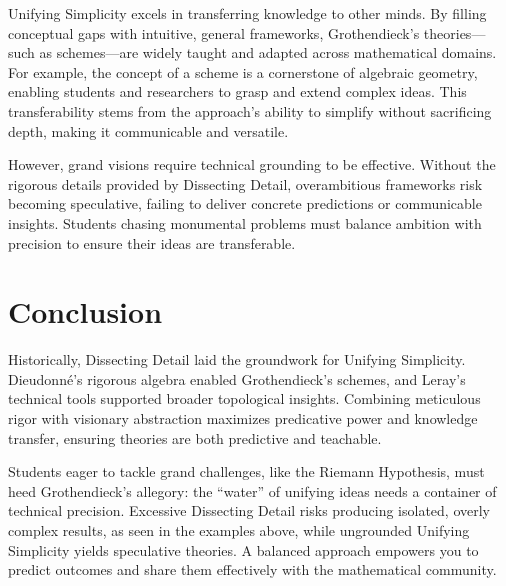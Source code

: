 \documentclass{article}
\begin{document}
Unifying Simplicity excels in transferring knowledge to other minds. By filling conceptual gaps with intuitive, general frameworks, Grothendieck’s theories—such as schemes—are widely taught and adapted across mathematical domains. For example, the concept of a scheme is a cornerstone of algebraic geometry, enabling students and researchers to grasp and extend complex ideas. This transferability stems from the approach’s ability to simplify without sacrificing depth, making it communicable and versatile.

However, grand visions require technical grounding to be effective. Without the rigorous details provided by Dissecting Detail, overambitious frameworks risk becoming speculative, failing to deliver concrete predictions or communicable insights. Students chasing monumental problems must balance ambition with precision to ensure their ideas are transferable.

\section{Conclusion}
Historically, Dissecting Detail laid the groundwork for Unifying Simplicity. Dieudonné’s rigorous algebra enabled Grothendieck’s schemes, and Leray’s technical tools supported broader topological insights. Combining meticulous rigor with visionary abstraction maximizes predicative power and knowledge transfer, ensuring theories are both predictive and teachable.

Students eager to tackle grand challenges, like the Riemann Hypothesis, must heed Grothendieck’s allegory: the “water” of unifying ideas needs a container of technical precision. Excessive Dissecting Detail risks producing isolated, overly complex results, as seen in the examples above, while ungrounded Unifying Simplicity yields speculative theories. A balanced approach empowers you to predict outcomes and share them effectively with the mathematical community.
\end{document}
